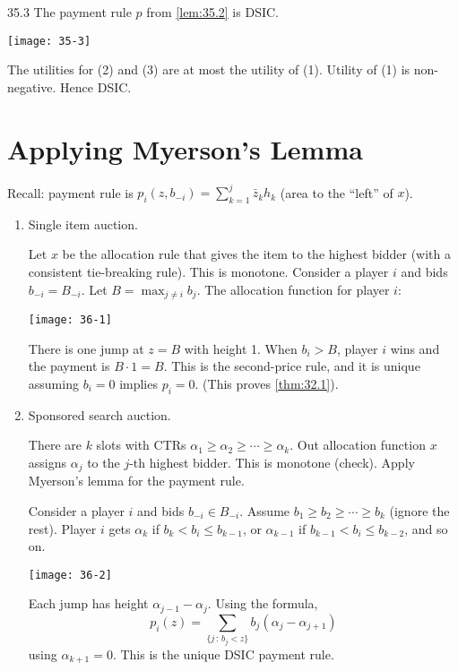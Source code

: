 \documentclass[12pt,letterpaper]{report}
\begin{document}
\begin{lem}{}{35.3}
  The payment rule $p$ from \cref{lem:35.2} is DSIC.
\end{lem}

\begin{thmproof}
  \begin{center}
    \texttt{[image: 35-3]}
  \end{center}
  The utilities for (2) and (3) are at most the utility of (1).
  Utility of (1) is non-negative.
  Hence DSIC.
\end{thmproof}

\section{Applying Myerson's Lemma}

Recall: payment rule is $p_i(z, b_{-i}) = \sum\limits_{k = 1}^j \bar{z}_k h_k$ (area to the ``left''
of $x$).

\begin{enumerate}
  \item
  Single item auction.

  Let $x$ be the allocation rule that gives the item to the highest bidder (with a consistent
  tie-breaking rule).
  This is monotone.
  Consider a player $i$ and bids $b_{-i} = B_{-i}$.
  Let $B = \max_{j \neq i} b_j$.
  The allocation function for player $i$:
  \begin{center}
    \texttt{[image: 36-1]}
  \end{center}
  There is one jump at $z = B$ with height 1.
  When $b_i > B$, player $i$ wins and the payment is $B \cdot 1 = B$.
  This is the second-price rule, and it is unique assuming $b_i = 0$ implies $p_i = 0$.
  (This proves \cref{thm:32.1}).

  \item
  Sponsored search auction.

  There are $k$ slots with CTRs $\alpha_1 \geq \alpha_2 \geq \cdots \geq \alpha_k$.
  Out allocation function $x$ assigns $\alpha_j$ to the $j$-th highest bidder.
  This is monotone (check).
  Apply Myerson's lemma for the payment rule.

  Consider a player $i$ and bids $b_{-i} \in B_{-i}$.
  Assume $b_1 \geq b_2 \geq \cdots \geq b_k$ (ignore the rest).
  Player $i$ gets $\alpha_k$ if $b_k < b_i \leq b_{k - 1}$, or $\alpha_{k - 1}$ if
  $b_{k - 1} < b_i \leq b_{k - 2}$, and so on.
  \begin{center}
    \texttt{[image: 36-2]}
  \end{center}
  Each jump has height $\alpha_{j - 1} - \alpha_j$.
  Using the formula,
  \[
    p_i(z) = \sum_{\{ j \, : \, b_j < z\}} b_j (\alpha_j - \alpha_{j + 1})
  \]
  using $\alpha_{k + 1} = 0$.
  This is the unique DSIC payment rule.
\end{enumerate}
\end{document}
